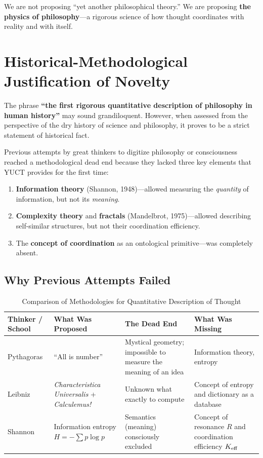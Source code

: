 \documentclass[12pt,a4paper]{article}
\begin{document}
	We are not proposing ``yet another philosophical theory.'' We are proposing \textbf{the physics of philosophy}—a rigorous science of how thought coordinates with reality and with itself.
	
	\section{Historical-Methodological Justification of Novelty}
	
	The phrase \textbf{``the first rigorous quantitative description of philosophy in human history''} may sound grandiloquent. However, when assessed from the perspective of the dry history of science and philosophy, it proves to be a strict statement of historical fact.
	
	Previous attempts by great thinkers to digitize philosophy or consciousness reached a methodological dead end because they lacked three key elements that YUCT provides for the first time:
	
	\begin{enumerate}
		\item \textbf{Information theory} (Shannon, 1948)—allowed measuring the \emph{quantity} of information, but not its \emph{meaning}.
		\item \textbf{Complexity theory} and \textbf{fractals} (Mandelbrot, 1975)—allowed describing self-similar structures, but not their coordination efficiency.
		\item The \textbf{concept of coordination} as an ontological primitive—was completely absent.
	\end{enumerate}
	
	\subsection{Why Previous Attempts Failed}
	
	\begin{table}[H]
		\centering
		\caption{Comparison of Methodologies for Quantitative Description of Thought}
		\label{tab:method-comparison}
		\begin{tabular}{p{3cm}p{3.5cm}p{3.5cm}p{4cm}}
			\toprule
			\textbf{Thinker / School} & \textbf{What Was Proposed} & \textbf{The Dead End} & \textbf{What Was Missing} \\
			\midrule
			Pythagoras & ``All is number'' & Mystical geometry; impossible to measure the meaning of an idea & Information theory, entropy \\
			Leibniz & \emph{Characteristica Universalis} + \emph{Calculemus!} & Unknown what exactly to compute & Concept of entropy and dictionary as a database \\
			Shannon & Information entropy \( H = -\sum p \log p \) & Semantics (meaning) consciously excluded & Concept of resonance \(R\) and coordination efficiency \(\Keff\) \\
			\bottomrule
		\end{tabular}
	\end{table}
	
\end{document}
